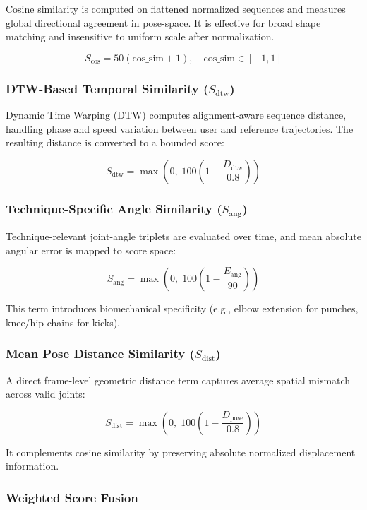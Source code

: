 \documentclass[12pt]{article}
\begin{document}
{Cosine similarity is computed on flattened normalized sequences and measures global directional agreement in pose-space. It is effective for broad shape matching and insensitive to uniform scale after normalization.

\[
S_{\text{cos}} = 50(\text{cos\_sim}+1), \quad \text{cos\_sim}\in[-1,1]
\]

\subsubsection{DTW-Based Temporal Similarity (\(S_{\text{dtw}}\))}

Dynamic Time Warping (DTW) computes alignment-aware sequence distance, handling phase and speed variation between user and reference trajectories. The resulting distance is converted to a bounded score:

\[
S_{\text{dtw}}=\max\left(0,\;100\left(1-\frac{D_{\text{dtw}}}{0.8}\right)\right)
\]

\subsubsection{Technique-Specific Angle Similarity (\(S_{\text{ang}}\))}

Technique-relevant joint-angle triplets are evaluated over time, and mean absolute angular error is mapped to score space:

\[
S_{\text{ang}}=\max\left(0,\;100\left(1-\frac{E_{\text{ang}}}{90}\right)\right)
\]

This term introduces biomechanical specificity (e.g., elbow extension for punches, knee/hip chains for kicks).

\subsubsection{Mean Pose Distance Similarity (\(S_{\text{dist}}\))}

A direct frame-level geometric distance term captures average spatial mismatch across valid joints:

\[
S_{\text{dist}}=\max\left(0,\;100\left(1-\frac{D_{\text{pose}}}{0.8}\right)\right)
\]

It complements cosine similarity by preserving absolute normalized displacement information.

\subsubsection{Weighted Score Fusion}

}
\end{document}
